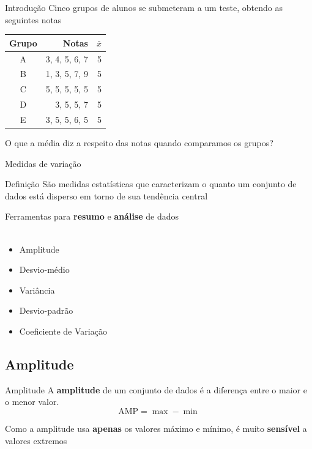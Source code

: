 \documentclass[10pt]{beamer}\usepackage[]{graphicx}\usepackage[]{color}
\theoremstyle{definition}
\begin{document}
\begin{frame}{Introdução}
  Cinco grupos de alunos se submeteram a um teste, obtendo as seguintes
  notas
  \begin{table}[htbp]
    \centering
    \begin{tabular}{crr}
      \hline
      \textbf{Grupo} & \textbf{Notas} & $\bar{x}$ \\ \hline
      A & 3, 4, 5, 6, 7 & 5 \\
      B & 1, 3, 5, 7, 9 & 5\\
      C & 5, 5, 5, 5, 5 & 5\\
      D & 3, 5, 5, 7 & 5\\
      E & 3, 5, 5, 6, 5 & 5\\
      \hline
    \end{tabular}
  \end{table}
  O que a média diz a respeito das notas quando comparamos os grupos?
\end{frame}

\begin{frame}{Medidas de variação}
  \begin{block}{Definição}
    São medidas estatísticas que caracterizam o quanto um conjunto de
    dados está disperso em torno de sua tendência central
  \end{block}
  \vspace{1em}
  Ferramentas para \textbf{resumo} e \textbf{análise} de dados\\~\\
  \begin{itemize}
  \item Amplitude
  \item Desvio-médio
  \item Variância
  \item Desvio-padrão
  \item Coeficiente de Variação
  \end{itemize}
\end{frame}

\subsection{Amplitude}

\begin{frame}{Amplitude}
  A \textbf{amplitude} de um conjunto de dados é a diferença entre o
  maior e o menor valor.
  \begin{equation*}
    \text{AMP} = \max - \min
  \end{equation*}
  \vspace{1em}

  Como a amplitude usa \textbf{apenas} os valores máximo e mínimo, é
  muito \textbf{sensível} a valores extremos \\~\\
\end{frame}
\end{document}
